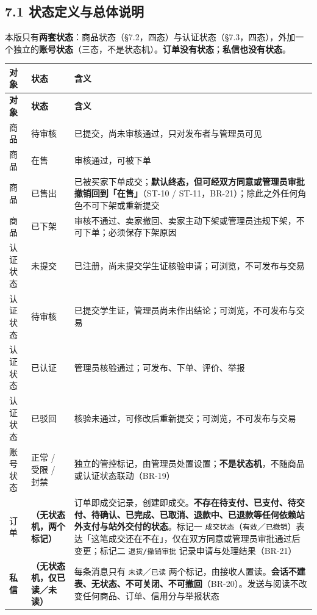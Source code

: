 \documentclass[12pt,a4paper]{ctexart}
\begin{document}
\subsection*{7.1 状态定义与总体说明}

本版只有\textbf{两套状态}：商品状态（§7.2，四态）与认证状态（§7.3，四态），外加一个独立的\textbf{账号状态}（三态，不是状态机）。\textbf{订单没有状态}；\textbf{私信也没有状态}。


{\scriptsize
\begin{longtable}{|p{1.50cm}|p{2.25cm}|p{12.25cm}|}
\hline
\textbf{对象} & \textbf{状态} & \textbf{含义} \\
\hline
\endfirsthead
\hline
\textbf{对象} & \textbf{状态} & \textbf{含义} \\
\hline
\endhead
\hline
\endfoot
商品 & 待审核 & 已提交，尚未审核通过，只对发布者与管理员可见 \\
\hline
商品 & 在售 & 审核通过，可被下单 \\
\hline
商品 & 已售出 & 已被买家下单成交；\textbf{默认终态，但可经双方同意或管理员审批撤销回到「在售」}（ST-10 / ST-11，BR-21）；除此之外任何角色不可下架或重新提交 \\
\hline
商品 & 已下架 & 审核不通过、卖家撤回、卖家主动下架或管理员违规下架，不可下单；必须保存下架原因 \\
\hline
认证状态 & 未提交 & 已注册，尚未提交学生证核验申请；可浏览，不可发布与交易 \\
\hline
认证状态 & 待审核 & 已提交学生证，管理员尚未作出结论；可浏览，不可发布与交易 \\
\hline
认证状态 & 已认证 & 管理员核验通过；可发布、下单、评价、举报 \\
\hline
认证状态 & 已驳回 & 核验未通过，可修改后重新提交；可浏览，不可发布与交易 \\
\hline
账号状态 & 正常 / 受限 / 封禁 & 独立的管控标记，由管理员处置设置；\textbf{不是状态机}，不随商品或认证状态联动（BR-19） \\
\hline
订单 & \textbf{（无状态机，两个标记）} & 订单即成交记录，创建即成交。\textbf{不存在待支付、已支付、待交付、待确认、已完成、已取消、退款中、已退款等任何依赖站外支付与站外交付的状态}。标记一 \texttt{成交状态}（\texttt{有效}／\texttt{已撤销}）表达「这笔成交还在不在」，仅在双方同意或管理员审批通过后变更；标记二 \texttt{退货/撤销审批} 记录申请与处理结果（BR-21） \\
\hline
\textbf{私信} & \textbf{（无状态机，仅已读／未读）} & 每条消息只有 \texttt{未读}／\texttt{已读} 两个标记，由接收人置读。\textbf{会话不建表、无状态、不可关闭、不可撤回}（BR-20）。发送与阅读不改变任何商品、订单、信用分与举报状态 \\
\hline
\end{longtable}
}
\end{document}
